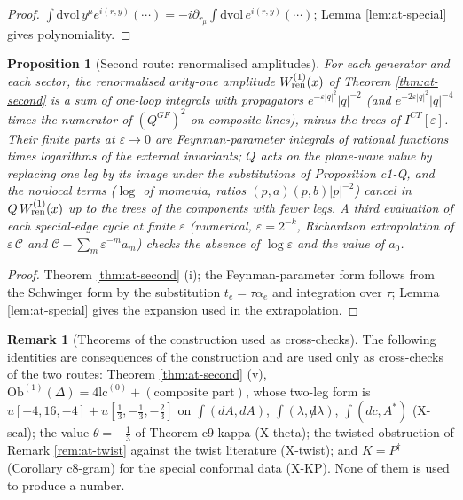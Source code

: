 \documentclass[11pt]{article}
\numberwithin{equation}{section}
\theoremstyle{plain}
\newtheorem{proposition}[theorem]{Proposition}
\theoremstyle{definition}
\newtheorem{remark}[theorem]{Remark}
\newcommand{\Ob}{\mathrm{Ob}}
\newcommand{\ICT}{I^{CT}[\varepsilon]}
\newcommand{\lc}{\mathrm{lc}}
\newcommand{\dslash}{{\not d}}
\begin{document}
\begin{proof}
$\int\mathrm{dvol}\,y^\mu e^{i(r,y)}(\cdots)=-i\partial_{r_\mu}\int\mathrm{dvol}\,e^{i(r,y)}(\cdots)$; Lemma \ref{lem:at-special} gives polynomiality.
\end{proof}

\begin{proposition}[Second route: renormalised amplitudes]
\label{prop:at-routeB}
For each generator and each sector, the renormalised arity-one amplitude $W^{(1)}_{\rm ren}(x)$ of Theorem \ref{thm:at-second} is a sum of one-loop integrals with propagators $e^{-\varepsilon|q|^2}|q|^{-2}$ (and $e^{-2\varepsilon|q|^2}|q|^{-4}$ times the numerator of $(Q^{GF})^2$ on composite lines), minus the trees of $\ICT$. Their finite parts at $\varepsilon\to0$ are Feynman-parameter integrals of rational functions times logarithms of the external invariants; $Q$ acts on the plane-wave value by replacing one leg by its image under the substitutions of Proposition c1-Q, and the nonlocal terms ($\log$ of momenta, ratios $(p,a)(p,b)|p|^{-2}$) cancel in $Q\,W^{(1)}_{\rm ren}(x)$ up to the trees of the components with fewer legs. A third evaluation of each special-edge cycle at finite $\varepsilon$ (numerical, $\varepsilon=2^{-k}$, Richardson extrapolation of $\varepsilon\,\mathcal C$ and $\mathcal C-\sum_m\varepsilon^{-m}a_m$) checks the absence of $\log\varepsilon$ and the value of $a_0$.
\end{proposition}

\begin{proof}
Theorem \ref{thm:at-second} (i); the Feynman-parameter form follows from the Schwinger form by the substitution $t_e=\tau\alpha_e$ and integration over $\tau$; Lemma \ref{lem:at-special} gives the expansion used in the extrapolation.
\end{proof}

\begin{remark}[Theorems of the construction used as cross-checks]
\label{rem:at-cross}
The following identities are consequences of the construction and are used only as cross-checks of the two routes: Theorem \ref{thm:at-second} (v), $\Ob^{(1)}(\Delta)=4\lc^{(0)}+(\text{composite part})$, whose two-leg form is $u[-4,16,-4]+u[\tfrac13,-\tfrac13,-\tfrac23]$ on $\int(dA,dA)$, $\int(\lambda,\dslash\lambda)$, $\int(dc,A^*)$ (X-scal); the value $\theta=-\tfrac13$ of Theorem c9-kappa (X-theta); the twisted obstruction of Remark \ref{rem:at-twist} against the twist literature (X-twist); and $K=P^\dagger$ (Corollary c8-gram) for the special conformal data (X-KP). None of them is used to produce a number.
\end{remark}
\end{document}
